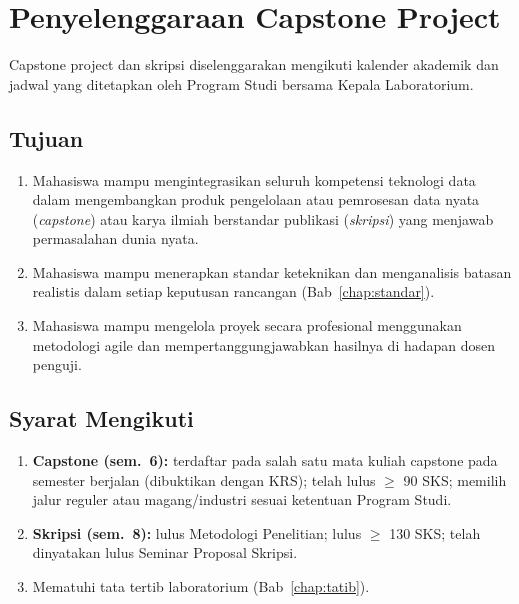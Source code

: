 \documentclass[12pt,a4paper]{report}
\begin{document}
\chapter{Penyelenggaraan Capstone Project}

Capstone project dan skripsi diselenggarakan mengikuti kalender akademik dan jadwal yang ditetapkan oleh Program Studi bersama Kepala Laboratorium.

\section{Tujuan}
\begin{enumerate}
\item Mahasiswa mampu mengintegrasikan seluruh kompetensi teknologi data dalam mengembangkan produk pengelolaan atau pemrosesan data nyata (\emph{capstone}) atau karya ilmiah berstandar publikasi (\emph{skripsi}) yang menjawab permasalahan dunia nyata.
\item Mahasiswa mampu menerapkan standar keteknikan dan menganalisis batasan realistis dalam setiap keputusan rancangan (Bab~\ref{chap:standar}).
\item Mahasiswa mampu mengelola proyek secara profesional menggunakan metodologi agile dan mempertanggungjawabkan hasilnya di hadapan dosen penguji.
\end{enumerate}

\section{Syarat Mengikuti}
\begin{enumerate}
\item \textbf{Capstone (sem.~6):} terdaftar pada salah satu mata kuliah capstone pada semester berjalan (dibuktikan dengan KRS); telah lulus $\geq$ 90 SKS; memilih jalur reguler atau magang/industri sesuai ketentuan Program Studi.
\item \textbf{Skripsi (sem.~8):} lulus Metodologi Penelitian; lulus $\geq$ 130 SKS; telah dinyatakan lulus Seminar Proposal Skripsi.
\item Mematuhi tata tertib laboratorium (Bab~\ref{chap:tatib}).
\end{enumerate}
\end{document}
